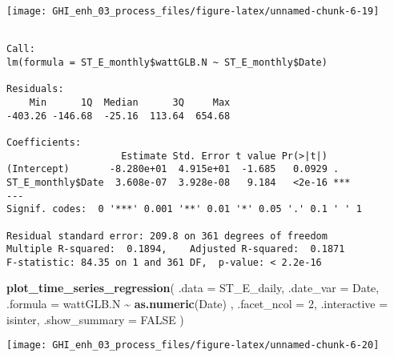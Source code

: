 \documentclass[
  10pt,
  a4paper,oneside]{article}
\newenvironment{Shaded}{\begin{snugshade}}{\end{snugshade}}
\newcommand{\AttributeTok}[1]{\textcolor[rgb]{0.13,0.29,0.53}{#1}}
\newcommand{\ConstantTok}[1]{\textcolor[rgb]{0.56,0.35,0.01}{#1}}
\newcommand{\DecValTok}[1]{\textcolor[rgb]{0.00,0.00,0.81}{#1}}
\newcommand{\FunctionTok}[1]{\textcolor[rgb]{0.13,0.29,0.53}{\textbf{#1}}}
\newcommand{\NormalTok}[1]{#1}
\newcommand{\OtherTok}[1]{\textcolor[rgb]{0.56,0.35,0.01}{#1}}
\newcommand{\SpecialCharTok}[1]{\textcolor[rgb]{0.81,0.36,0.00}{\textbf{#1}}}
\begin{document}
\begin{center}\texttt{[image: GHI\_enh\_03\_process\_files/figure-latex/unnamed-chunk-6-19]} \end{center}

\begin{Shaded}
\end{Shaded}

\begin{verbatim}

Call:
lm(formula = ST_E_monthly$wattGLB.N ~ ST_E_monthly$Date)

Residuals:
    Min      1Q  Median      3Q     Max 
-403.26 -146.68  -25.16  113.64  654.68 

Coefficients:
                    Estimate Std. Error t value Pr(>|t|)    
(Intercept)       -8.280e+01  4.915e+01  -1.685   0.0929 .  
ST_E_monthly$Date  3.608e-07  3.928e-08   9.184   <2e-16 ***
---
Signif. codes:  0 '***' 0.001 '**' 0.01 '*' 0.05 '.' 0.1 ' ' 1

Residual standard error: 209.8 on 361 degrees of freedom
Multiple R-squared:  0.1894,    Adjusted R-squared:  0.1871 
F-statistic: 84.35 on 1 and 361 DF,  p-value: < 2.2e-16
\end{verbatim}

\begin{Shaded}
\begin{Highlighting}[]
\FunctionTok{plot\_time\_series\_regression}\NormalTok{(}
    \AttributeTok{.data         =}\NormalTok{ ST\_E\_daily,}
    \AttributeTok{.date\_var     =}\NormalTok{ Date,}
    \AttributeTok{.formula      =}\NormalTok{ wattGLB.N }\SpecialCharTok{\textasciitilde{}} \FunctionTok{as.numeric}\NormalTok{(Date)  ,}
    \AttributeTok{.facet\_ncol   =} \DecValTok{2}\NormalTok{,}
    \AttributeTok{.interactive  =}\NormalTok{ isinter,}
    \AttributeTok{.show\_summary =} \ConstantTok{FALSE}
\NormalTok{)}
\end{Highlighting}
\end{Shaded}

\begin{center}\texttt{[image: GHI\_enh\_03\_process\_files/figure-latex/unnamed-chunk-6-20]} \end{center}
\end{document}
